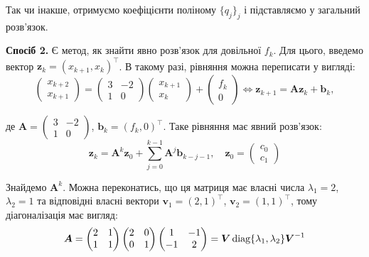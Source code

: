 \documentclass{hw_template}
\begin{document}
Так чи інакше, отримуємо коефіцієнти поліному $\{q_{j}\}_j$ і підставляємо у загальний розв'язок.

\textbf{Спосіб 2.} Є метод, як знайти явно розв'язок для довільної $f_k$. Для цього,
введемо вектор $\boldsymbol{z}_k = (x_{k+1}, x_k)^{\top}$. В такому разі, рівняння можна переписати у вигляді:
\begin{equation*}
    \begin{pmatrix}
        x_{k+2} \\ x_{k+1}
    \end{pmatrix} = \begin{pmatrix}
        3 & -2 \\ 1 & 0
    \end{pmatrix}\begin{pmatrix}
        x_{k+1} \\ x_k
    \end{pmatrix} + \begin{pmatrix}
        f_k \\ 0
    \end{pmatrix} \iff \boldsymbol{z}_{k+1} = \boldsymbol{A}\boldsymbol{z}_k + \boldsymbol{b}_k,
\end{equation*}

де $\boldsymbol{A} = \begin{pmatrix}
    3 & -2 \\ 1 & 0
\end{pmatrix}$, $\boldsymbol{b}_k = (f_k, 0)^{\top}$. Таке рівняння має явний розв'язок:
\begin{equation*}
    \boldsymbol{z}_k = \boldsymbol{A}^k\boldsymbol{z}_0 + \sum_{j=0}^{k-1}\boldsymbol{A}^j\boldsymbol{b}_{k-j-1}, \quad \boldsymbol{z}_0 = \begin{pmatrix}
        c_0 \\ c_1
    \end{pmatrix}
\end{equation*}

Знайдемо $\boldsymbol{A}^k$. Можна переконатись, що ця матриця має власні числа
$\lambda_1=2$, $\lambda_2=1$ та відповідні власні вектори $\mathbf{v}_1=(2,1)^{\top}$, 
$\mathbf{v}_2 = (1,1)^{\top}$, тому діагоналізація має вигляд:
\begin{equation*}
    \boldsymbol{A} = \begin{pmatrix}
        2 & 1 \\ 1 & 1
    \end{pmatrix}\begin{pmatrix}
        2 & 0 \\ 0 & 1
    \end{pmatrix}\begin{pmatrix}
        1 & -1 \\ -1 & 2
    \end{pmatrix} = \boldsymbol{V}\operatorname{\text{diag}}\{\lambda_1,\lambda_2\}\boldsymbol{V}^{-1}
\end{equation*}
\end{document}
